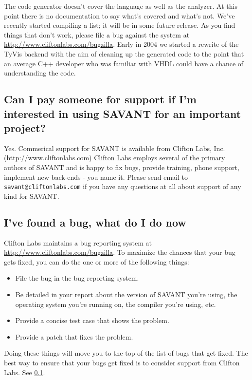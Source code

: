 \documentclass[11pt]{article}
\begin{document}
The code generator doesn't cover the language as well as the analyzer. At
this point there is no documentation to say what's covered and what's not.
We've recently started compiling a list; it will be in some future release.
As you find things that don't work, please file a bug against the system at
\url{http://www.cliftonlabs.com/bugzilla}.  Early in 2004 we started a
rewrite of the TyVis backend with the aim of cleaning up the generated code
to the point that an average C++ developer who was familiar with VHDL could
have a chance of understanding the code.

\subsection{Can I pay someone for support if I'm interested in using SAVANT for an
important project?}\label{commercial_support}

Yes.  Commerical support for SAVANT is available from Clifton Labs,
Inc. (\url{http://www.cliftonlabs.com}) Clifton Labs employs several of the
primary authors of SAVANT and is happy to fix bugs, provide training, phone
support, implement new back-ends - you name it.  Please send email to {\tt
savant@cliftonlabs.com} if you have any questions at all about support of
any kind for SAVANT.

\subsection{I've found a bug, what do I do now}

Clifton Labs maintains a bug reporting system at
\url{http://www.cliftonlabs.com/bugzilla}.  To maximize the chances that
your bug gets fixed, you can do the one or more of the following things:
\begin{itemize}
\item File the bug in the bug reporting system.
\item Be detailed in your report about the version of SAVANT you're using,
the operating system you're running on, the compiler you're using, etc.
\item Provide a concise test case that shows the problem.
\item Provide a patch that fixes the problem.
\end{itemize}

Doing these things will move you to the top of the list of bugs that get
fixed.  The best way to ensure that your bugs get fixed is to consider
support from Clifton Labs.  See \ref{commercial_support}.
\end{document}
